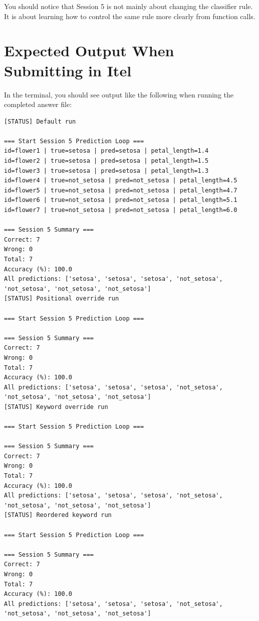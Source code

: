 \begin{tcolorbox}[title=Why This Matters]
You should notice that Session 5 is not mainly about changing the classifier rule. It is about learning how to control the same rule more clearly from function calls.
\end{tcolorbox}

\section{Expected Output When Submitting in Itel}

In the terminal, you should see output like the following when running the completed answer file:
\begin{verbatim}
[STATUS] Default run

=== Start Session 5 Prediction Loop ===
id=flower1 | true=setosa | pred=setosa | petal_length=1.4
id=flower2 | true=setosa | pred=setosa | petal_length=1.5
id=flower3 | true=setosa | pred=setosa | petal_length=1.3
id=flower4 | true=not_setosa | pred=not_setosa | petal_length=4.5
id=flower5 | true=not_setosa | pred=not_setosa | petal_length=4.7
id=flower6 | true=not_setosa | pred=not_setosa | petal_length=5.1
id=flower7 | true=not_setosa | pred=not_setosa | petal_length=6.0

=== Session 5 Summary ===
Correct: 7
Wrong: 0
Total: 7
Accuracy (%): 100.0
All predictions: ['setosa', 'setosa', 'setosa', 'not_setosa', 'not_setosa', 'not_setosa', 'not_setosa']
[STATUS] Positional override run

=== Start Session 5 Prediction Loop ===

=== Session 5 Summary ===
Correct: 7
Wrong: 0
Total: 7
Accuracy (%): 100.0
All predictions: ['setosa', 'setosa', 'setosa', 'not_setosa', 'not_setosa', 'not_setosa', 'not_setosa']
[STATUS] Keyword override run

=== Start Session 5 Prediction Loop ===

=== Session 5 Summary ===
Correct: 7
Wrong: 0
Total: 7
Accuracy (%): 100.0
All predictions: ['setosa', 'setosa', 'setosa', 'not_setosa', 'not_setosa', 'not_setosa', 'not_setosa']
[STATUS] Reordered keyword run

=== Start Session 5 Prediction Loop ===

=== Session 5 Summary ===
Correct: 7
Wrong: 0
Total: 7
Accuracy (%): 100.0
All predictions: ['setosa', 'setosa', 'setosa', 'not_setosa', 'not_setosa', 'not_setosa', 'not_setosa']
\end{verbatim}

